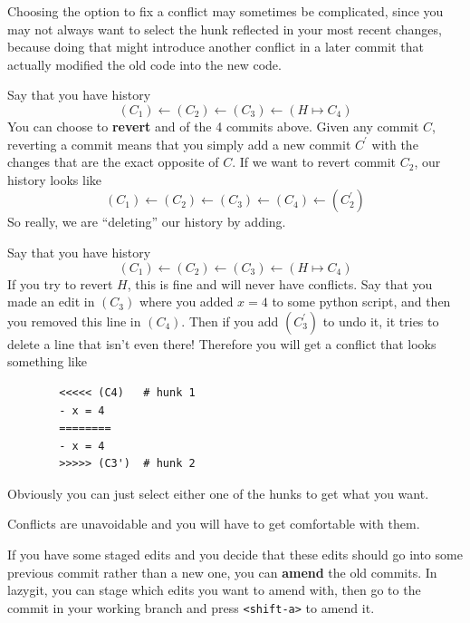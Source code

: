 \documentclass{article}
\begin{document}
    Choosing the option to fix a conflict may sometimes be complicated, since you may not always want to select the hunk reflected in your most recent changes, because doing that might introduce another conflict in a later commit that actually modified the old code into the new code. 

    \begin{definition} 
      Say that you have history
      \begin{equation}
        (C_1) \leftarrow (C_2) \leftarrow (C_3) \leftarrow (H \mapsto C_4)
      \end{equation} 
      You can choose to \textbf{revert} and of the 4 commits above. Given any commit $C$, reverting a commit means that you simply add a new commit $C^\prime$ with the changes that are the exact opposite of $C$. If we want to revert commit $C_2$, our history looks like 
      \begin{equation}
        (C_1) \leftarrow (C_2) \leftarrow (C_3) \leftarrow (C_4) \leftarrow (C_2^\prime)
      \end{equation}  
      So really, we are ``deleting'' our history by adding. 
    \end{definition} 

    \begin{example}
      Say that you have history
      \begin{equation}
        (C_1) \leftarrow (C_2) \leftarrow (C_3) \leftarrow (H \mapsto C_4)
      \end{equation} 
      If you try to revert $H$, this is fine and will never have conflicts. Say that you made an edit in $(C_3)$ where you added $x = 4$ to some python script, and then you removed this line in $(C_4)$. Then if you add $(C_3^\prime)$ to undo it, it tries to delete a line that isn't even there! Therefore you will get a conflict that looks something like 
      \begin{lstlisting}
        <<<<< (C4)   # hunk 1 
        - x = 4 
        ========
        - x = 4
        >>>>> (C3')  # hunk 2
      \end{lstlisting}
      Obviously you can just select either one of the hunks to get what you want. 
    \end{example} 

    Conflicts are unavoidable and you will have to get comfortable with them.  

    \begin{definition}
      If you have some staged edits and you decide that these edits should go into some previous commit rather than a new one, you can \textbf{amend} the old commits. In lazygit, you can stage which edits you want to amend with, then go to the commit in your working branch and press \texttt{<shift-a>} to amend it. 
    \end{definition}
\end{document}
